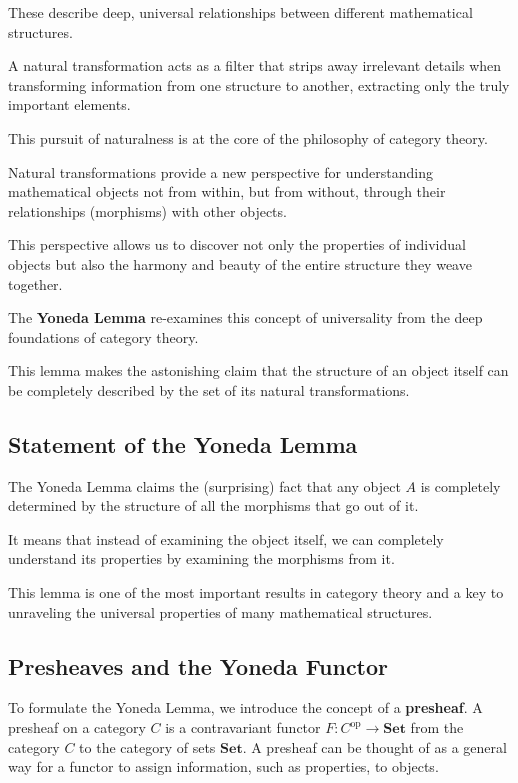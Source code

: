 \documentclass[uplatex,a4j,12pt,dvipdfmx]{jsarticle}
\begin{document}
{}

These describe deep, universal relationships between different mathematical structures.

A natural transformation acts as a filter that strips away irrelevant details when transforming information from one structure to another, extracting only the truly important elements.

	{}

This pursuit of naturalness is at the core of the philosophy of category theory.

Natural transformations provide a new perspective for understanding mathematical objects not from within, but from without, through their relationships (morphisms) with other objects.

This perspective allows us to discover not only the properties of individual objects but also the harmony and beauty of the entire structure they weave together.

	{}

The \textbf{Yoneda Lemma} re-examines this concept of universality from the deep foundations of category theory.

This lemma makes the astonishing claim that the structure of an object itself can be completely described by the set of its natural transformations.

\subsection{Statement of the Yoneda Lemma}

The Yoneda Lemma claims the (surprising) fact that any object $A$ is completely determined by the structure of all the morphisms that go out of it.

It means that instead of examining the object itself, we can completely understand its properties by examining the morphisms from it.

This lemma is one of the most important results in category theory and a key to unraveling the universal properties of many mathematical structures.


\subsection{Presheaves and the Yoneda Functor}
To formulate the Yoneda Lemma, we introduce the concept of a \textbf{presheaf}.
A presheaf on a category $C$ is a contravariant functor $F: C^{\text{op}} \to \mathbf{Set}$ from the category $C$ to the category of sets $\mathbf{Set}$.
A presheaf can be thought of as a general way for a functor to assign information, such as properties, to objects.
\end{document}
